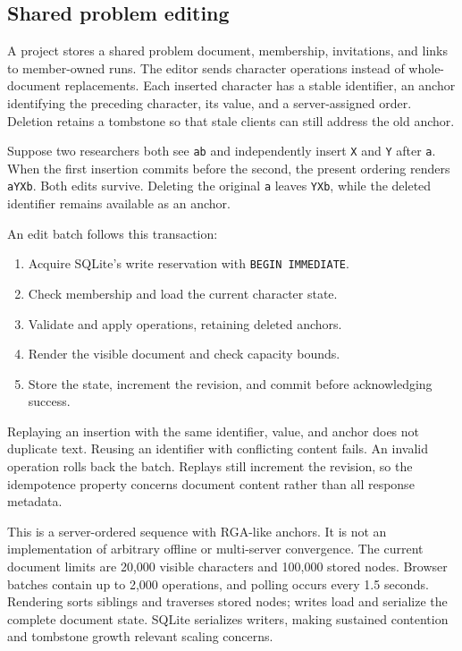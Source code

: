 \documentclass[10pt,letterpaper]{article}
\begin{document}
\subsection{Shared problem editing}

A project stores a shared problem document, membership, invitations, and links to member-owned runs. The editor sends character operations instead of whole-document replacements. Each inserted character has a stable identifier, an anchor identifying the preceding character, its value, and a server-assigned order. Deletion retains a tombstone so that stale clients can still address the old anchor.

Suppose two researchers both see \nolinkurl{ab} and independently insert \nolinkurl{X} and \nolinkurl{Y} after \nolinkurl{a}. When the first insertion commits before the second, the present ordering renders \nolinkurl{aYXb}. Both edits survive. Deleting the original \nolinkurl{a} leaves \nolinkurl{YXb}, while the deleted identifier remains available as an anchor.


An edit batch follows this transaction:

\begin{enumerate}

\item Acquire SQLite's write reservation with \texttt{BEGIN IMMEDIATE}.

\item Check membership and load the current character state.

\item Validate and apply operations, retaining deleted anchors.

\item Render the visible document and check capacity bounds.

\item Store the state, increment the revision, and commit before acknowledging success.

\end{enumerate}

Replaying an insertion with the same identifier, value, and anchor does not duplicate text. Reusing an identifier with conflicting content fails. An invalid operation rolls back the batch. Replays still increment the revision, so the idempotence property concerns document content rather than all response metadata.

This is a server-ordered sequence with RGA-like anchors. It is not an implementation of arbitrary offline or multi-server convergence. The current document limits are 20,000 visible characters and 100,000 stored nodes. Browser batches contain up to 2,000 operations, and polling occurs every 1.5 seconds. Rendering sorts siblings and traverses stored nodes; writes load and serialize the complete document state. SQLite serializes writers, making sustained contention and tombstone growth relevant scaling concerns.
\end{document}
